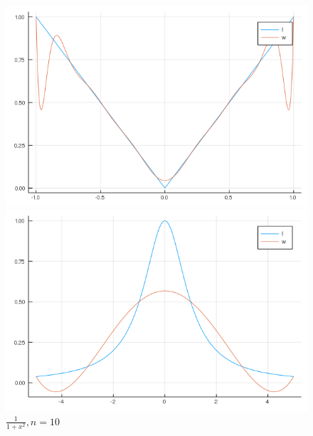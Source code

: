 \documentclass[12pt]{article}
\begin{document}
\begin{figure}[!htb]
  \includegraphics[width=\linewidth]{myplot_3_15.png}
  \caption{$|x|, n=5$}
\endminipage\hfill
{}
  \includegraphics[width=\linewidth]{myplot_4_5.png}
  \caption{$\frac{1}{1+x^2}, n=10$}
\endminipage
\end{figure}
\end{document}
